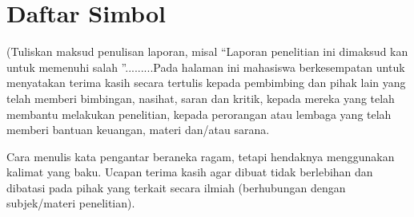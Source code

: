 \clearpage

\chapter*{Daftar Simbol}
\thispagestyle{fancy}
\fancyhf{}
\fancyhead[R]{\thepage}

\justifying
(Tuliskan maksud penulisan laporan, misal “Laporan penelitian ini dimaksud kan untuk memenuhi salah ”.........Pada halaman ini mahasiswa berkesempatan untuk menyatakan terima kasih secara tertulis kepada pembimbing dan pihak lain yang telah memberi bimbingan, nasihat, saran dan kritik, kepada mereka yang telah membantu melakukan penelitian, kepada perorangan atau lembaga yang telah memberi bantuan keuangan, materi dan/atau sarana.

Cara menulis kata pengantar beraneka ragam, tetapi hendaknya menggunakan kalimat yang baku. Ucapan terima kasih agar dibuat tidak berlebihan dan dibatasi pada pihak yang terkait secara ilmiah (berhubungan dengan subjek/materi penelitian). 